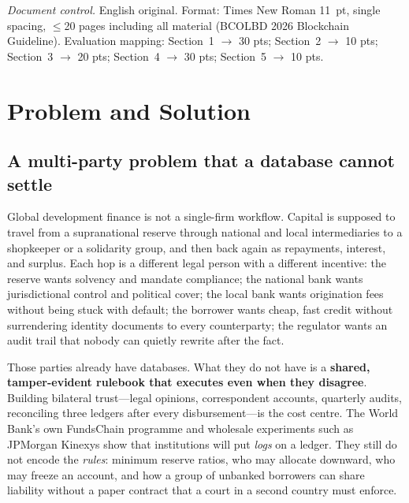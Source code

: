 \documentclass[11pt,a4paper]{article}
\begin{document}
\vspace{3.2mm}
{\small\noindent\textit{Document control.} English original. Format: Times New Roman 11~pt, single spacing, $\leq$20 pages including all material (BCOLBD 2026 Blockchain Guideline). Evaluation mapping: Section~1 $\to$ 30 pts; Section~2 $\to$ 10 pts; Section~3 $\to$ 20 pts; Section~4 $\to$ 30 pts; Section~5 $\to$ 10 pts.}

\clearpage
\setcounter{page}{2}

\section{Problem and Solution}
\label{sec:problem}

\subsection{A multi-party problem that a database cannot settle}

Global development finance is not a single-firm workflow. Capital is supposed to travel from a supranational reserve through national and local intermediaries to a shopkeeper or a solidarity group, and then back again as repayments, interest, and surplus. Each hop is a different legal person with a different incentive: the reserve wants solvency and mandate compliance; the national bank wants jurisdictional control and political cover; the local bank wants origination fees without being stuck with default; the borrower wants cheap, fast credit without surrendering identity documents to every counterparty; the regulator wants an audit trail that nobody can quietly rewrite after the fact.

Those parties already have databases. What they do not have is a \textbf{shared, tamper-evident rulebook that executes even when they disagree}. Building bilateral trust---legal opinions, correspondent accounts, quarterly audits, reconciling three ledgers after every disbursement---is the cost centre. The World Bank's own FundsChain programme and wholesale experiments such as JPMorgan Kinexys show that institutions will put \textit{logs} on a ledger. They still do not encode the \textit{rules}: minimum reserve ratios, who may allocate downward, who may freeze an account, and how a group of unbanked borrowers can share liability without a paper contract that a court in a second country must enforce.
\end{document}
